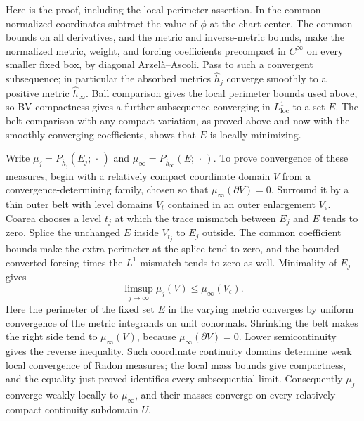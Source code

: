 Here is the proof, including the local perimeter assertion.  In the
common normalized coordinates subtract the value of $\phi$ at the chart
center.  The common bounds on all derivatives, and the metric and
inverse-metric bounds, make the normalized metric, weight, and forcing
coefficients precompact in $C^\infty$ on every smaller fixed box, by
diagonal Arzelà--Ascoli.  Pass to such a convergent subsequence; in
particular the absorbed metrics $\widehat h_j$ converge smoothly to a
positive metric $\widehat h_\infty$.  Ball comparison gives the local
perimeter bounds used above, so BV compactness gives a further
subsequence converging in $L^1_{\mathrm{loc}}$ to a set $E$.  The belt
comparison with any compact variation, as proved above and now with the
smoothly converging coefficients, shows that $E$ is locally minimizing.

Write $\mu_j=P_{\widehat h_j}(E_j;\,\cdot\,)$ and
$\mu_\infty=P_{\widehat h_\infty}(E;\,\cdot\,)$.  To prove convergence
of these measures, begin with a relatively compact coordinate domain
$V$ from a convergence-determining family, chosen so that
$\mu_\infty(\partial V)=0$.  Surround it by a thin outer belt with level
domains $V_t$ contained in an outer enlargement $V_\epsilon$.  Coarea
chooses a level $t_j$ at which the trace mismatch between $E_j$ and $E$
tends to zero.  Splice the unchanged $E$ inside $V_{t_j}$ to $E_j$
outside.  The common coefficient bounds make the extra perimeter at the
splice tend to zero, and the bounded converted forcing times the
$L^1$ mismatch tends to zero as well.  Minimality of $E_j$ gives
\[
       \limsup_{j\to\infty}\mu_j(V)\le\mu_\infty(V_\epsilon).
\]
Here the perimeter of the fixed set $E$ in the varying metric converges
by uniform convergence of the metric integrands on unit conormals.
Shrinking the belt makes the right side tend to $\mu_\infty(V)$, because
$\mu_\infty(\partial V)=0$.  Lower semicontinuity gives the reverse
inequality.  Such coordinate continuity domains determine weak local
convergence of Radon measures; the local mass bounds give compactness,
and the equality just proved identifies every subsequential limit.
Consequently $\mu_j$ converge weakly locally to $\mu_\infty$, and their
masses converge on every relatively compact continuity subdomain $U$.

